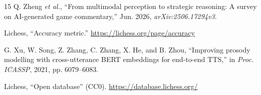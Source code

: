 \documentclass[conference]{IEEEtran}
\begin{document}
\begin{thebibliography}{15}
Q. Zheng \emph{et al.}, ``From multimodal perception to strategic reasoning:
A survey on AI-generated game commentary,'' Jun. 2026,
\emph{arXiv:2506.17294v3}.

Lichess, ``Accuracy metric.'' \url{https://lichess.org/page/accuracy}

G. Xu, W. Song, Z. Zhang, C. Zhang, X. He, and B. Zhou, ``Improving prosody
modelling with cross-utterance BERT embeddings for end-to-end TTS,'' in
\emph{Proc. ICASSP}, 2021, pp. 6079--6083.

Lichess, ``Open database'' (CC0). \url{https://database.lichess.org/}

\end{thebibliography}
\end{document}
